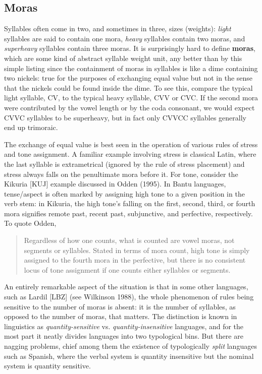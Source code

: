 \subsection{Moras}

Syllables often come in two, and sometimes in three, sizes (weights): {\it
  light} syllables are said to contain one mora, {\it heavy} syllables
contain two moras, and {\it superheavy} syllables contain three moras. It is
surprisingly hard to define {\bf moras}, which are some kind of abstract
syllable weight unit, any better than by this simple listing since the
containment of moras in syllables is like a dime containing two nickels: true
for the purposes of exchanging equal value but not in the sense that the
nickels could be found inside the dime. To see this, compare the typical light
syllable, CV, to the typical heavy syllable, CVV or CVC.  If the second mora
were contributed by the vowel length or by the coda consonant, we would expect
CVVC syllables to be superheavy, but in fact only CVVCC syllables generally
end up trimoraic.  

The exchange of equal value is best seen in the operation of various rules of
stress and tone assignment. A familiar example involving stress is classical
Latin, where the last syllable is extrametrical (ignored by the rule of stress
placement) and stress always falls on the penultimate mora before it. For
tone, consider the Kikuria [KUJ] example discussed in Odden (1995). In Bantu
languages, tense/aspect is often marked by assigning high tone to a given
position in the verb stem: in Kikuria, the high tone's falling on the first,
second, third, or fourth mora signifies remote past, recent past, subjunctive,
and perfective, respectively. To quote Odden, \nocite{Odden:1995}
 

\begin{quote} 
Regardless of how one counts, what is counted are vowel moras, not segments
or syllables. Stated in terms of mora count, high tone is simply assigned 
to the fourth mora in the perfective, but there is no consistent locus of tone
assignment if one counts either syllables or segments.
\end{quote} 

\noindent An entirely remarkable aspect of the situation is that in some other
languages, such as Lardil [LBZ] (see Wilkinson 1988), the whole phenomenon of
rules being sensitive to the number of moras is absent: it is the number of
syllables, as opposed to the number of moras, that matters. The distinction is
known in linguistics as {\sl quantity-sensitive} vs.  {\sl
  quantity-insensitive} languages, and for the most part it neatly divides
languages into two typological bins. But there are nagging problems, chief
among them the existence of typologically {\it split} languages such as
Spanish, where the verbal system is quantity insensitive but the nominal
system is quantity sensitive.

